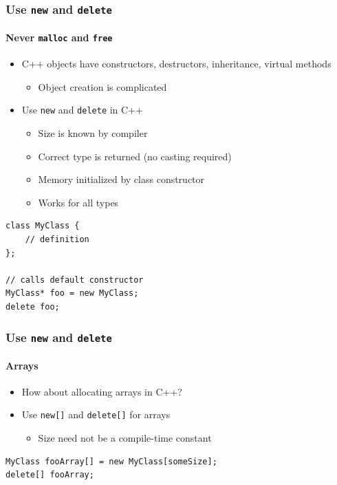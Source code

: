 \documentclass[table]{beamer}
\newcounter{rulecount}
\newcommand{\declarerule}{\textbf{\color{themeblue}{Rule \therulecount:}} }
\begin{document}
\begin{frame}[fragile]
    \frametitle{\declarerule Use \texttt{new} and \texttt{delete} }
    \framesubtitle{Never \texttt{malloc} and \texttt{free} }
    \begin{itemize}
        \item C++ objects have constructors, destructors, inheritance, virtual methods
            \begin{itemize}
                \item Object creation is complicated
            \end{itemize}
        \item Use \texttt{new} and \texttt{delete} in C++
            \begin{itemize}
                \item Size is known by compiler
                \item Correct type is returned (no casting required)
                \item Memory initialized by class constructor
                \item Works for all types
            \end{itemize}
    \end{itemize}
    \begin{lstlisting}[title=Dynamically allocating an object in C++]
class MyClass {
    // definition
};

// calls default constructor
MyClass* foo = new MyClass;
delete foo;
    \end{lstlisting}
\end{frame}

\begin{frame}[fragile]
    \frametitle{\declarerule Use \texttt{new} and \texttt{delete} }
    \framesubtitle{Arrays}
    \begin{itemize}
        \item How about allocating arrays in C++?
        \item Use \texttt{new[]} and \texttt{delete[]} for arrays 
            \begin{itemize}
                \item Size need not be a compile-time constant
            \end{itemize}
    \end{itemize}
    \begin{lstlisting}[title=Dynamically allocating an array of objects in C++]
MyClass fooArray[] = new MyClass[someSize];
delete[] fooArray;
    \end{lstlisting}
\end{frame}
\end{document}
